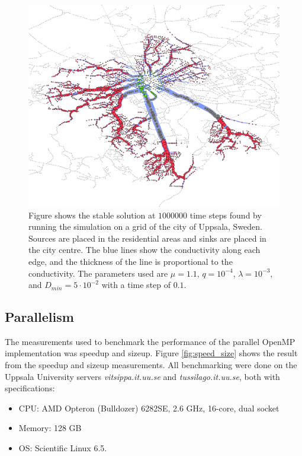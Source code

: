 \begin{figure}
\centering
\includegraphics[width=\textwidth]{img/uppsala.png}
\caption{Figure shows the stable solution at $1000000$ time steps found by running the simulation on a grid of the city of Uppsala, Sweden. Sources are placed in the residential areas and sinks are placed in the city centre. The blue lines show the conductivity along each edge, and the thickness of the line is proportional to the conductivity. The parameters used are $\mu = 1.1$, $q = 10^{-4}$, $\lambda = 10^{-3},$ and $D_{min}=5 \cdot 10^{-2}$ with a time step of $0.1$.}
\label{fig:uppsala}
\end{figure}

\subsection{Parallelism}
The measurements used to benchmark the performance of the parallel OpenMP implementation was speedup and sizeup. Figure \ref{fig:speed_size} shows the result from the speedup and sizeup measurements. All benchmarking were done on the Uppsala University servers \textit{vitsippa.it.uu.se} and \textit{tussilago.it.uu.se}, both with specifications: 

\begin{itemize}
\item CPU: AMD Opteron (Bulldozer) 6282SE, 2.6 GHz, 16-core, dual socket
\item Memory: 128 GB
\item OS: Scientific Linux 6.5.
\end{itemize}

